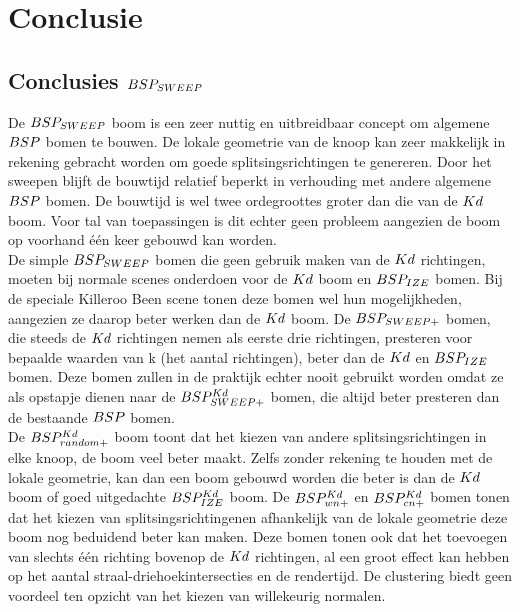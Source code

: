 \chapter{Conclusie}
\label{hoofdstuk:conclusie}

\section{Conclusies $BSP_{SWEEP}$}
De $BSP_{SWEEP}$ boom is een zeer nuttig en uitbreidbaar concept om algemene $BSP$ bomen te bouwen.
De lokale geometrie van de knoop kan zeer makkelijk in rekening gebracht worden om goede splitsingsrichtingen te genereren.
Door het sweepen blijft de bouwtijd relatief beperkt in verhouding met andere algemene $BSP$ bomen.
De bouwtijd is wel twee ordegroottes groter dan die van de $Kd$ boom.
Voor tal van toepassingen is dit echter geen probleem aangezien de boom op voorhand één keer gebouwd kan worden.\\

De simple $BSP_{SWEEP}$ bomen die geen gebruik maken van de $Kd$ richtingen, moeten bij normale scenes onderdoen voor de $Kd$ boom en $BSP_{IZE}$ bomen.
Bij de speciale Killeroo Been scene tonen deze bomen wel hun mogelijkheden, aangezien ze daarop beter werken dan de $Kd$ boom.
De $BSP_{SWEEP+}$ bomen, die steeds de $Kd$ richtingen nemen als eerste drie richtingen, presteren voor bepaalde waarden van k (het aantal richtingen), beter dan de $Kd$ en $BSP_{IZE}$ bomen.
Deze bomen zullen in de praktijk echter nooit gebruikt worden omdat ze als opstapje dienen naar de $BSP^{Kd}_{SWEEP+}$ bomen, die altijd beter presteren dan de bestaande $BSP$ bomen.\\

De $BSP^{Kd}_{random+}$ boom toont dat het kiezen van andere splitsingsrichtingen in elke knoop, de boom veel beter maakt. 
Zelfs zonder rekening te houden met de lokale geometrie, kan dan een boom gebouwd worden die beter is dan de $Kd$ boom of goed uitgedachte $BSP^{Kd}_{IZE}$ boom.
De $BSP^{Kd}_{wn+}$ en $BSP^{Kd}_{cn+}$ bomen tonen dat het kiezen van splitsingsrichtingenen afhankelijk van de lokale geometrie deze boom nog beduidend beter kan maken.
Deze bomen tonen ook dat het toevoegen van slechts één richting bovenop de $Kd$ richtingen, al een groot effect kan hebben op het aantal straal-driehoekintersecties en de rendertijd.
De clustering biedt geen voordeel ten opzicht van het kiezen van willekeurig normalen.

